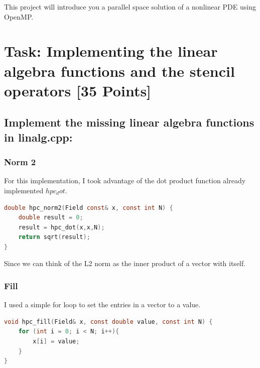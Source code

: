 \documentclass[unicode,11pt,a4paper,oneside,numbers=endperiod,openany]{scrartcl}
\begin{document}
\setassignment

\newline

\assignmentpolicy
This project will introduce you a parallel space solution of a nonlinear PDE using OpenMP.


\section{Task: Implementing the linear algebra functions and the stencil operators [35 Points]}

\subsection{Implement the missing linear algebra functions in linalg.cpp:}
\subsubsection{Norm 2}
For this implementation, I took advantage of the dot product function already implemented $hpc_dot$.
\begin{lstlisting}[language=C]
  double hpc_norm2(Field const& x, const int N) {
    double result = 0;
    result = hpc_dot(x,x,N);
    return sqrt(result);
}
\end{lstlisting}  
Since we can think of the L2 norm as the inner product of a vector with itself.
\subsubsection{Fill}
I used a simple for loop to set the entries in a vector to a value.
\begin{lstlisting}[language=C]
  void hpc_fill(Field& x, const double value, const int N) {
    for (int i = 0; i < N; i++){
        x[i] = value;
    }
}
\end{lstlisting}  
\end{document}

